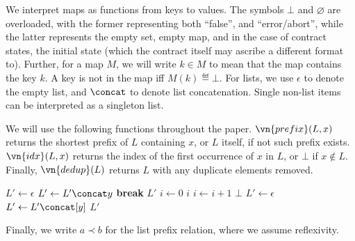 We interpret maps as functions from keys to values. The symbols $\bot$ and
$\varnothing$ are overloaded, with the former representing both
``false'', and ``error/abort'', while the latter represents the empty set, empty
map, and in the case of contract states, the initial state (which the contract
itself may ascribe a different format to). Further, for a map $M$, we will write
$k \in M$ to mean that the map contains the key $k$. A key is not in the map iff
$M(k) \eqdef \bot$. For lists, we use $\epsilon$ to denote the empty list, and
$\concat$ to denote list concatenation. Single non-list items can be interpreted
as a singleton list.

We will use the following functions throughout the paper. $\vn{prefix}(L, x)$
returns the shortest prefix of $L$ containing $x$, or $L$ itself, if not such
prefix exists. $\vn{idx}(L, x)$ returns the index of the first occurrence of
$x$ in $L$, or $\bot$ if $x \notin L$. Finally, $\vn{dedup}(L)$ returns $L$
with any duplicate elements removed.

\begin{algorithmic}
    \State \Let $L' \gets \epsilon$
      \State $L' \gets L' \concat y$
        \textbf{break}
      \EndIf
    \EndFor
    \State \Return $L'$
  \EndFunction
    \State \Let $i \gets 0$
        \Return $i$
      \EndIf
      \State \Let $i \gets i + 1$
    \EndFor
    \State \Return $\bot$
  \EndFunction
    \State \Let $L' \gets \epsilon$
        \Let $L' \gets L' \concat [y]$
      \EndIf
    \EndFor
    \State \Return $L'$
  \EndFunction
\end{algorithmic}

\noindent
Finally, we write $a \prec b$ for the list prefix relation, where we assume
reflexivity.

